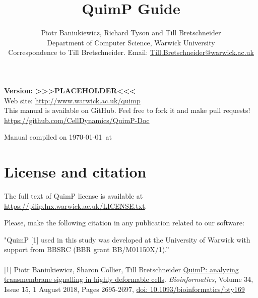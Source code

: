 \documentclass[a4paper,12pt]{article}
\begin{document}
\title{QuimP Guide}
\author{Piotr Baniukiewicz, Richard Tyson and Till Bretschneider\\ \small Department of Computer Science, Warwick University\\ \small Correspondence to Till Bretschneider. Email: \href{mailto:Till.Bretschneider@warwick.ac.uk}{Till.Bretschneider@warwick.ac.uk}\\}
\date{}
\maketitle
\begin{center}
\textbf{{\large Version: >>>PLACEHOLDER<<<}}\\
\vspace{1cm}
Web site: \url{http://www.warwick.ac.uk/quimp}\\
\vspace{2cm}
This manual is available on GitHub. Feel free to fork it and make pull requests!\\
\url{https://github.com/CellDynamics/QuimP-Doc}\\
\end{center}
\begin{center}
\vfill
{\footnotesize Manual compiled on \today\  at \currenttime}
\end{center}

\tableofcontents

\setlength{\parskip}{10pt}
\setlength{\parindent}{0pt}

\section{License and citation}
The full text of QuimP license is available at \href{https://pilip.lnx.warwick.ac.uk/LICENSE.txt}{https://pilip.lnx.warwick.ac.uk/LICENSE.txt}.

Please, make the following citation in any publication related to our software:


{\large "QuimP [1] used in this study was developed at the University of Warwick with support from BBSRC (BBR grant BB/M01150X/1).”\\\\
 {[1]} Piotr Baniukiewicz, Sharon Collier, Till Bretschneider \href{https://academic.oup.com/bioinformatics/article/34/15/2695/4939330}{QuimP: analyzing transmembrane signalling in highly deformable cells}. \textit{Bioinformatics}, Volume 34, Issue 15, 1 August 2018, Pages 2695-2697, \href{https://doi.org/10.1093/bioinformatics/bty169}{doi: 10.1093/bioinformatics/bty169}}
\end{document}
